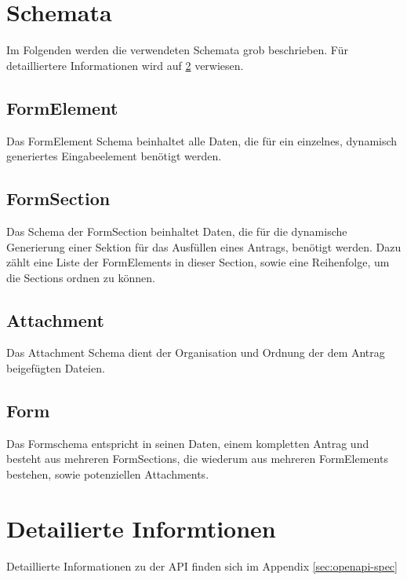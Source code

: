 \section{Schemata}
Im Folgenden werden die verwendeten Schemata grob beschrieben. Für detailliertere Informationen
wird auf \ref{sec:Detailiertere Informationen} verwiesen.

\subsection{FormElement}
Das FormElement Schema beinhaltet alle Daten, die für ein einzelnes, dynamisch generiertes
Eingabeelement benötigt werden.

\subsection{FormSection}
Das Schema der FormSection beinhaltet Daten, die für die dynamische Generierung einer Sektion
für das Ausfüllen eines Antrags, benötigt werden. Dazu zählt eine Liste der FormElements in
dieser Section, sowie eine Reihenfolge, um die Sections ordnen zu können.

\subsection{Attachment}
Das Attachment Schema dient der Organisation und Ordnung der dem Antrag beigefügten Dateien.

\subsection{Form}
Das Formschema entspricht in seinen Daten, einem kompletten Antrag und besteht aus mehreren
FormSections, die wiederum aus mehreren FormElements bestehen, sowie potenziellen Attachments.

\section{Detailierte Informtionen}\label{sec:Detailiertere Informationen}
Detaillierte Informationen zu der \ac{API} finden sich im Appendix \ref{sec:openapi-spec}